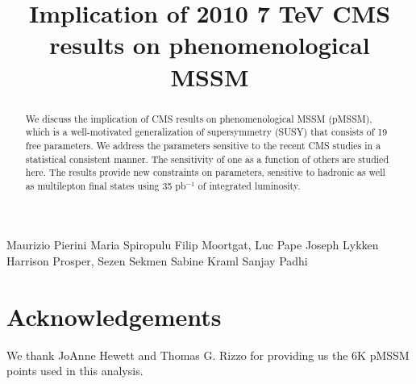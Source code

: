 \documentclass{cmspaper}
\begin{document}
%
\begin{titlepage}
\title{Implication of 2010 7 TeV CMS results on phenomenological MSSM}

  \begin{Authlist}
    Maurizio Pierini
    Maria Spiropulu
    Filip Moortgat, Luc Pape
    Joseph Lykken
    Harrison Prosper, Sezen Sekmen
    Sabine Kraml
    Sanjay Padhi
    
  \end{Authlist}

\begin{abstract}
We discuss the implication of CMS results on phenomenological MSSM (pMSSM), which is a well-motivated generalization of supersymmetry (SUSY) that consists of 19 free parameters.  We address the parameters sensitive 
to the recent CMS studies in a statistical consistent manner. The sensitivity of one as a function 
of others are studied here. The results provide new constraints on parameters, sensitive to hadronic as well as 
multilepton final states using 35 pb$^{-1}$ of integrated luminosity.
\end{abstract}
\end{titlepage}










\section*{Acknowledgements}

We thank JoAnne Hewett and Thomas G. Rizzo for providing us the 6K pMSSM points used in this analysis.

\clearpage

\end{document}
